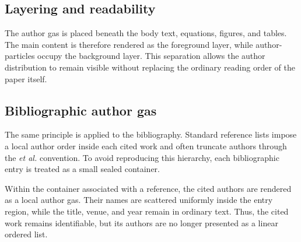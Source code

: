 \documentclass[10pt,letterpaper]{article}
\theoremstyle{definition}
\theoremstyle{remark}
\begin{document}



\subsection{Layering and readability}

The author gas is placed beneath the body text, equations, figures, and tables. The main  content is therefore rendered as the foreground layer, while author-particles occupy the background layer. This separation allows the author distribution to remain visible without replacing the ordinary reading order of the paper itself.


\subsection{Bibliographic author gas}

The same principle is applied to the bibliography. Standard reference lists impose a local author order inside each cited work and often truncate authors through the \textit{et al.} convention. To avoid reproducing this hierarchy, each bibliographic entry is treated as a small sealed container.

Within the container associated with a reference, the cited authors are rendered as a local author gas. Their names are scattered uniformly inside the entry region, while the title, venue, and year remain in ordinary text. Thus, the cited work remains identifiable, but its authors are no longer presented as a linear ordered list.
\end{document}
